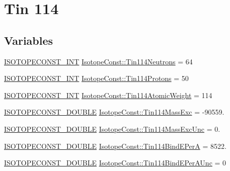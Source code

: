 \hypertarget{group___isotope_const-_tin-_sn114}{}\section{Tin 114}
\label{group___isotope_const-_tin-_sn114}
\subsection*{Variables}
\begin{DoxyCompactItemize}
\item 
\mbox{\hyperlink{group___isotope_const-_macros_ga5f18360b3e99483a35c32d789e62621c}{I\+S\+O\+T\+O\+P\+E\+C\+O\+N\+S\+T\+\_\+\+I\+NT}} \mbox{\hyperlink{group___isotope_const-_tin-_sn114_ga3697f6861d2a3e2298a0dce9e7c4cefc}{Isotope\+Const\+::\+Tin114\+Neutrons}} = 64
\item 
\mbox{\hyperlink{group___isotope_const-_macros_ga5f18360b3e99483a35c32d789e62621c}{I\+S\+O\+T\+O\+P\+E\+C\+O\+N\+S\+T\+\_\+\+I\+NT}} \mbox{\hyperlink{group___isotope_const-_tin-_sn114_ga9e5486963bdda2ec4b3aa685c17c3ed4}{Isotope\+Const\+::\+Tin114\+Protons}} = 50
\item 
\mbox{\hyperlink{group___isotope_const-_macros_ga5f18360b3e99483a35c32d789e62621c}{I\+S\+O\+T\+O\+P\+E\+C\+O\+N\+S\+T\+\_\+\+I\+NT}} \mbox{\hyperlink{group___isotope_const-_tin-_sn114_ga7f23e22efb1cd386373710863b415dbd}{Isotope\+Const\+::\+Tin114\+Atomic\+Weight}} = 114
\item 
\mbox{\hyperlink{group___isotope_const-_macros_ga8f45a7272ce02c0b4c65c44636ed719a}{I\+S\+O\+T\+O\+P\+E\+C\+O\+N\+S\+T\+\_\+\+D\+O\+U\+B\+LE}} \mbox{\hyperlink{group___isotope_const-_tin-_sn114_gaf56c7b26fee3b7a81e6e309fcfee88e8}{Isotope\+Const\+::\+Tin114\+Mass\+Exc}} = -\/90559.
\item 
\mbox{\hyperlink{group___isotope_const-_macros_ga8f45a7272ce02c0b4c65c44636ed719a}{I\+S\+O\+T\+O\+P\+E\+C\+O\+N\+S\+T\+\_\+\+D\+O\+U\+B\+LE}} \mbox{\hyperlink{group___isotope_const-_tin-_sn114_ga17826c015251d78bc2421237f9a92a3c}{Isotope\+Const\+::\+Tin114\+Mass\+Exc\+Unc}} = 0.
\item 
\mbox{\hyperlink{group___isotope_const-_macros_ga8f45a7272ce02c0b4c65c44636ed719a}{I\+S\+O\+T\+O\+P\+E\+C\+O\+N\+S\+T\+\_\+\+D\+O\+U\+B\+LE}} \mbox{\hyperlink{group___isotope_const-_tin-_sn114_ga5f007904b03671242da016574adbd5fb}{Isotope\+Const\+::\+Tin114\+Bind\+E\+PerA}} = 8522.
\item 
\mbox{\hyperlink{group___isotope_const-_macros_ga8f45a7272ce02c0b4c65c44636ed719a}{I\+S\+O\+T\+O\+P\+E\+C\+O\+N\+S\+T\+\_\+\+D\+O\+U\+B\+LE}} \mbox{\hyperlink{group___isotope_const-_tin-_sn114_ga2f438544ca4c41a0bbf49faf8c1c60ef}{Isotope\+Const\+::\+Tin114\+Bind\+E\+Per\+A\+Unc}} = 0

\end{DoxyCompactItemize}
